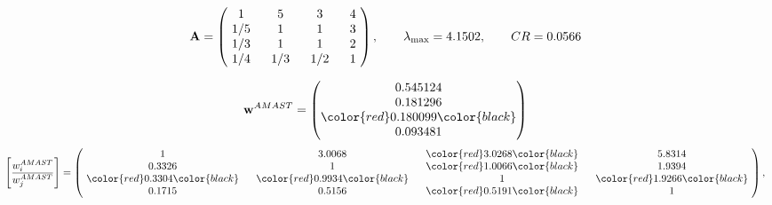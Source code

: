 \begin{example}
\begin{equation*}
\mathbf{A} =
\begin{pmatrix}
$\,\,$ 1 $\,\,$ & $\,\,$5$\,\,$ & $\,\,$3$\,\,$ & $\,\,$4 $\,\,$ \\
$\,\,$ 1/5$\,\,$ & $\,\,$ 1 $\,\,$ & $\,\,$1$\,\,$ & $\,\,$3 $\,\,$ \\
$\,\,$ 1/3$\,\,$ & $\,\,$ 1 $\,\,$ & $\,\,$ 1 $\,\,$ & $\,\,$2 $\,\,$ \\
$\,\,$ 1/4$\,\,$ & $\,\,$ 1/3$\,\,$ & $\,\,$ 1/2$\,\,$ & $\,\,$ 1  $\,\,$ \\
\end{pmatrix},
\qquad
\lambda_{\max} =
4.1502,
\qquad
CR = 0.0566
\end{equation*}

\begin{equation*}
\mathbf{w}^{AMAST} =
\begin{pmatrix}
0.545124\\
0.181296\\
\color{red} 0.180099\color{black} \\
0.093481
\end{pmatrix}\end{equation*}
\begin{equation*}
\left[ \frac{{w}^{AMAST}_i}{{w}^{AMAST}_j} \right] =
\begin{pmatrix}
$\,\,$ 1 $\,\,$ & $\,\,$3.0068$\,\,$ & $\,\,$\color{red} 3.0268\color{black} $\,\,$ & $\,\,$5.8314$\,\,$ \\
$\,\,$0.3326$\,\,$ & $\,\,$ 1 $\,\,$ & $\,\,$\color{red} 1.0066\color{black} $\,\,$ & $\,\,$1.9394  $\,\,$ \\
$\,\,$\color{red} 0.3304\color{black} $\,\,$ & $\,\,$\color{red} 0.9934\color{black} $\,\,$ & $\,\,$ 1 $\,\,$ & $\,\,$\color{red} 1.9266\color{black}  $\,\,$ \\
$\,\,$0.1715$\,\,$ & $\,\,$0.5156$\,\,$ & $\,\,$\color{red} 0.5191\color{black} $\,\,$ & $\,\,$ 1  $\,\,$ \\
\end{pmatrix},
\end{equation*}


\end{example}

